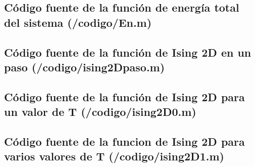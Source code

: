 \documentclass[a4paper,12pt]{article}
\begin{document}


\subsection{C\'odigo fuente de la funci\'on de energ\'ia total del sistema (/codigo/En.m)}



\subsection{C\'odigo fuente de la funci\'on de Ising 2D en un paso (/codigo/ising2Dpaso.m)}



\subsection{C\'odigo fuente de la funci\'on de Ising 2D para un valor de T (/codigo/ising2D0.m)}



\subsection{C\'odigo fuente de la funcion de Ising 2D para varios valores de T (/codigo/ising2D1.m)}


\end{document}
